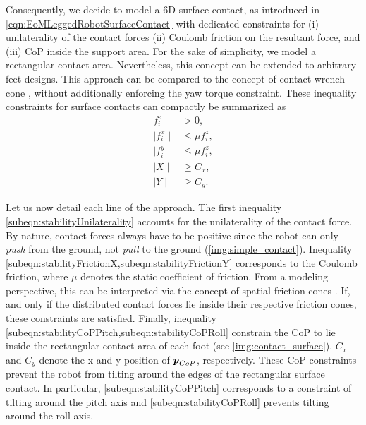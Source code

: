 Consequently, we decide to model a 6D surface contact, as introduced in \cref{eqn:EoMLeggedRobotSurfaceContact} with dedicated constraints for (i) unilaterality of the contact forces (ii) Coulomb friction on the resultant force, and (iii) \gls{CoP} inside the support area. For the sake of simplicity, we model a rectangular contact area. Nevertheless, this concept can be extended  to arbitrary feet designs. This approach can be compared to the concept of contact wrench cone \cite{caron2015stability}, without additionally enforcing the yaw torque constraint. These inequality constraints for surface contacts can compactly be summarized as
\begin{subequations}\label{eqn:contractWrenchConeReduced}
\begin{align}
f_i^z &> 0 \label{subeqn:stabilityUnilaterality},\\
\mid f_i^x\mid &\leq \mu f_i^z \label{subeqn:stabilityFrictionX},\\
\mid f_i^y\mid &\leq \mu f_i^z \label{subeqn:stabilityFrictionY},\\
\mid X\mid & \geq C_x \label{subeqn:stabilityCoPPitch},\\
\mid Y\mid & \geq C_y \label{subeqn:stabilityCoPRoll}.
\end{align}
\end{subequations}

Let us now detail each line of the approach. 
The first inequality \cref{subeqn:stabilityUnilaterality} accounts for the unilaterality of the contact force. By nature, contact forces always have to be positive since the robot can only \textit{push} from the ground, not \textit{pull} to the ground (\cref{img:simple_contact}). 
Inequality \cref{subeqn:stabilityFrictionX,subeqn:stabilityFrictionY} corresponds to the Coulomb friction, where $\mu$ denotes the static coefficient of friction. From a modeling perspective, this can be interpreted via the concept of spatial friction cones \cite{kao2016contact}. If, and only if the distributed contact forces lie inside their respective friction cones, these constraints are satisfied. 
Finally, inequality \cref{subeqn:stabilityCoPPitch,subeqn:stabilityCoPRoll} constrain the \gls{CoP} to lie inside the rectangular contact area of each foot (see \cref{img:contact_surface}). $C_x$ and $C_y$ denote the x and y position of $\bm{\mathit{p}}_{CoP}$, respectively. These \gls{CoP} constraints prevent the robot from tilting around the edges of the rectangular surface contact. In particular, \cref{subeqn:stabilityCoPPitch} corresponds to a constraint of tilting around the pitch axis and \cref{subeqn:stabilityCoPRoll} prevents tilting around the roll axis.

